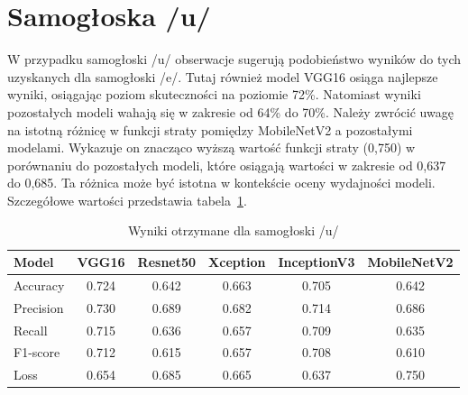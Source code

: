 
\section{Samogłoska /u/}
\label{sec:samogloska-u}

W przypadku samogłoski /u/ obserwacje sugerują podobieństwo wyników do tych uzyskanych dla samogłoski /e/.
Tutaj również model VGG16 osiąga najlepsze wyniki, osiągając poziom skuteczności na poziomie 72\%.
Natomiast wyniki pozostałych modeli wahają się w zakresie od 64\% do 70\%.
Należy zwrócić uwagę na istotną różnicę w funkcji straty pomiędzy MobileNetV2 a pozostałymi modelami.
Wykazuje on znacząco wyższą wartość funkcji straty (0,750) w porównaniu do pozostałych modeli, które osiągają wartości w zakresie od 0,637 do 0,685.
Ta różnica może być istotna w kontekście oceny wydajności modeli.
Szczegółowe wartości przedstawia tabela~\ref{tab:wyniki-u}.


\begin{table}[ht]
\centering
\caption{Wyniki otrzymane dla samogłoski /u/}
\label{tab:wyniki-u}
\begin{tabular}{|l|c|c|c|c|c|}
\hline
\textbf{Model} &\textbf{VGG16} &\textbf{Resnet50} &\textbf{Xception} &\textbf{InceptionV3} &\textbf{MobileNetV2} \\ \hline
    Accuracy &0.724 &0.642 &0.663 &0.705 &0.642 \\ \hline
    Precision &0.730 &0.689 &0.682 &0.714 &0.686 \\ \hline
    Recall &0.715 &0.636 &0.657 &0.709 &0.635 \\ \hline
    F1-score &0.712 &0.615 &0.657 &0.708 &0.610 \\ \hline
    Loss &0.654 &0.685 &0.665 &0.637 &0.750 \\ \hline
\end{tabular}
\end{table}

